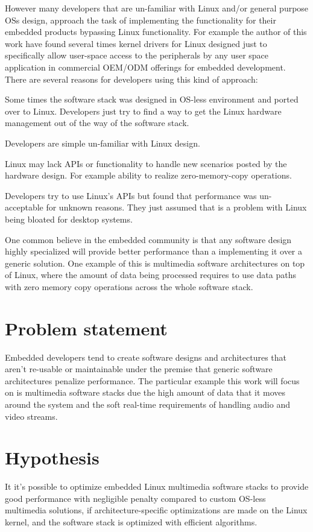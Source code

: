 However many developers that are un-familiar with Linux and/or general purpose \acp{OS} design, approach the task of implementing the functionality for their embedded products bypassing Linux functionality. For example the author of this work have found several times kernel drivers for Linux designed just to specifically allow user-space access to the peripherals by any user space application in commercial \ac{OEM}/\ac{ODM} offerings for embedded development.  There are several reasons for developers using this kind of approach:
\begin{itemize*}
\item Some times the software stack was designed in \ac{OS}-less environment and ported over to Linux. Developers just try to find a way to get the Linux hardware management out of the way of the software stack.
\item Developers are simple un-familiar with Linux design.
\item Linux may lack APIs or functionality to handle new scenarios posted by the hardware design. For example ability to realize zero-memory-copy operations.
\item Developers try to use Linux's APIs but found that performance was un-acceptable for unknown reasons. They just assumed that is a problem with Linux being bloated for desktop systems.
\end{itemize*}

One common believe in the embedded community is that any software design highly specialized will provide better performance than a implementing it over a generic solution. One example of this is multimedia software architectures on top of Linux, where the amount of data being processed requires to use data paths with zero memory copy operations across the whole software stack.
 
\section{Problem statement}
Embedded developers tend to create software designs and architectures that aren't re-usable or maintainable under the premise that generic software architectures penalize performance. The particular example this work will focus on is multimedia software stacks due the high amount of data that it moves around the system and the soft real-time requirements of handling audio and video streams.

\section{Hypothesis}
It it's possible to optimize embedded Linux multimedia software stacks to provide good performance with negligible penalty compared to custom \ac{OS}-less multimedia solutions, if architecture-specific optimizations are made on the Linux kernel, and the software stack is optimized with efficient algorithms.

